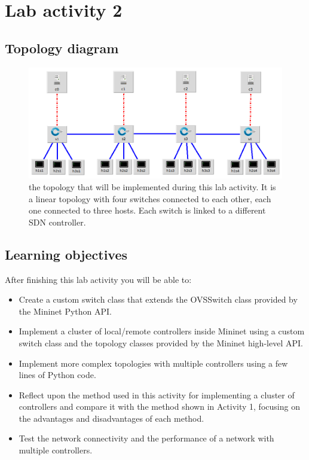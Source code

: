 
\section*{Lab activity 2}

\subsection*{Topology diagram}
\begin{figure}[htb]
	\centering
	\includegraphics[width=1\linewidth]{img/topology-2.png}
	\caption{the topology that will be implemented during this lab activity.
  It is a linear topology with four switches connected to each other,
  each one connected to three hosts. Each switch is linked to a different
  SDN controller.}
	\label{fig:topology-2}
\end{figure}

\subsection*{Learning objectives}
After finishing this lab activity you will be able to:
\begin{itemize}
  \item Create a custom switch class that extends the OVSSwitch class provided
  by the Mininet Python API.
  \item Implement a cluster of local/remote controllers inside Mininet using a custom
  switch class and the topology classes provided by the Mininet high-level API.
  \item Implement more complex topologies with multiple controllers using a
  few lines of Python code.
  \item Reflect upon the method used in this activity for implementing a cluster of controllers
  and compare it with the method shown in Activity 1, focusing on the advantages
  and disadvantages of each method.
  \item Test the network connectivity and the performance of a network with multiple
  controllers.
\end{itemize}






